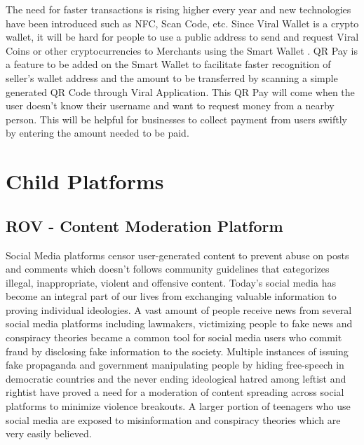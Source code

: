 \documentclass[10pt]{article}
\begin{document}
The need for faster transactions is rising higher every year and new technologies have been introduced such as NFC, Scan Code, etc. Since Viral Wallet is a crypto wallet, it will be hard for people to use a public address to send and request Viral Coins or other cryptocurrencies to Merchants using the Smart Wallet . QR Pay is a feature to be added on the Smart Wallet to facilitate faster recognition of seller’s wallet address and the amount to be transferred by scanning a simple generated QR Code through Viral Application. This QR Pay will come when the user doesn’t know their username and want to request money from a nearby person. This will be helpful for businesses to collect payment from users swiftly by entering the amount needed to be paid.\\

\newpage

\section{Child Platforms}


\subsection{ROV - Content Moderation Platform}



Social Media platforms censor user-generated content to prevent abuse on posts and comments which doesn't follows community guidelines that categorizes illegal, inappropriate, violent and offensive content.  Today's social media has become an integral part of our lives from exchanging valuable information to proving individual ideologies. A vast amount of people receive news from several social media platforms including lawmakers, victimizing people to fake news and conspiracy theories became a common tool for social media users who commit fraud by disclosing fake information to the society. Multiple instances of issuing fake propaganda and government manipulating people by hiding free-speech in democratic countries and the never ending ideological hatred among leftist and rightist have proved a need for a moderation of content spreading across social platforms to minimize violence breakouts. A larger portion of teenagers who use social media are exposed to misinformation and conspiracy theories which are very easily believed.\\
\end{document}
